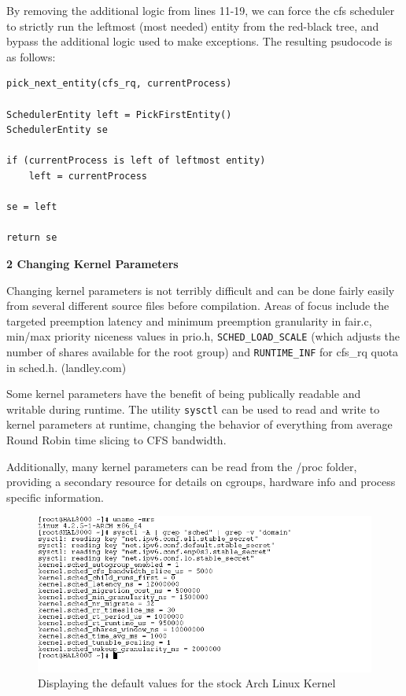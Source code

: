 By removing the additional logic from lines 11-19, we can force the cfs scheduler to strictly run the leftmost (most needed) entity from the red-black tree, and bypass the additional logic used to make exceptions. The resulting psudocode is as follows:

\begin{lstlisting}
pick_next_entity(cfs_rq, currentProcess)

SchedulerEntity left = PickFirstEntity()
SchedulerEntity se

if (currentProcess is left of leftmost entity)
	left = currentProcess

se = left

return se
\end{lstlisting}

\vspace{1pc}

\noindent\textbf{2 Changing Kernel Parameters}
\vspace{1pc}

Changing kernel parameters is not terribly difficult and can be done fairly easily from several different source files before compilation. Areas of focus include the targeted preemption latency and minimum preemption granularity in fair.c, min/max priority niceness values in prio.h, \texttt{SCHED\_LOAD\_SCALE} (which adjusts the number of shares available for the root group) and \texttt{RUNTIME\_INF} for cfs\_rq quota in sched.h. (landley.com)

Some kernel parameters have the benefit of being publically readable and  writable during runtime. The utility \texttt{sysctl} can be used to read and write to kernel parameters at runtime, changing the behavior of everything from average Round Robin time slicing to CFS bandwidth.

Additionally, many kernel parameters can be read from the /proc folder, providing a secondary resource for details on cgroups, hardware info and process specific information.

\begin{figure}[hb]
	\includegraphics[width=1.0\columnwidth]{images/sysctl}
	\caption{Displaying the default values for the stock Arch Linux Kernel}
\end{figure}


